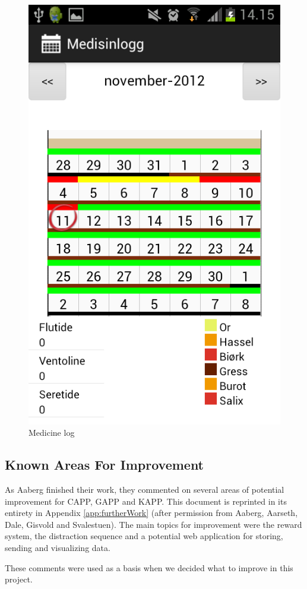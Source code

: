 \begin{figure}[H]
\begin{minipage}[b]{0.4\linewidth}
		\includegraphics[width=0.20\paperwidth]{Pictures/app-screenshots/logg.png}
		\caption{Medicine log}
		\label{fig:medicine-log}
	\end{minipage}
\end{figure}

\subsection{Known Areas For Improvement}
\label{sec:improvements}
As Aaberg \etal{} finished their work, they commented on several areas of potential improvement for CAPP, GAPP and KAPP. This document is reprinted in its entirety in Appendix \ref{app:furtherWork} (after permission from Aaberg, Aarseth, Dale, Gisvold and Svalestuen). The main topics for improvement were the reward system, the distraction sequence and a potential web application for storing, sending and visualizing data. 


These comments were used as a basis when we decided what to improve in this project. 




